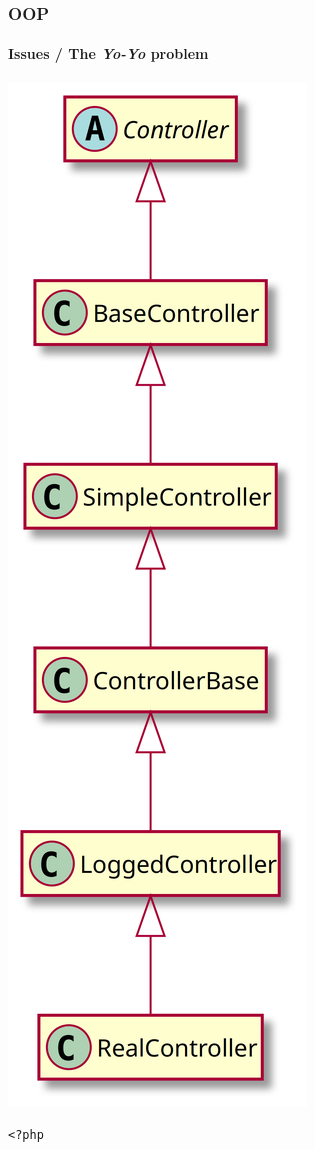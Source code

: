 \begin{frame}[fragile,c]
    \frametitle{OOP}
    \framesubtitle{Issues / The \textit{Yo-Yo} problem}

    \noindent
    \begin{minipage}{.20\textwidth}
        \begin{center}
            \includegraphics[height=.75\textheight]{src/session--composition-and-inheritance/resources/yo-yo-problem.png}
        \end{center}
    \end{minipage}\hfill
    \begin{minipage}{.80\textwidth}
        \begin{lstlisting}[numbers=none]
        <?php


\end{lstlisting}
\end{minipage}
\end{frame}
